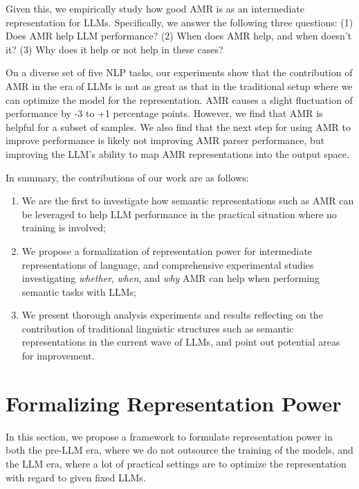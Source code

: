 Given this, we empirically study how good AMR is as an intermediate representation for LLMs.
Specifically, we answer the following three questions:
(1) Does AMR help LLM performance?
(2) When does AMR help, and when doesn't it?
(3) Why does it help or not help in these cases?

On a diverse set of {five} NLP tasks, our experiments show that the contribution of AMR in the era of LLMs is not as great as that in the traditional setup where we can optimize the model for the representation. AMR causes a slight fluctuation of performance by -3 to +1 percentage points. However, we find that AMR is helpful for a subset of samples.
We also find that the next step for using AMR to improve performance is likely not improving AMR parser performance, but
improving the LLM's ability to map AMR representations into the output space.

In summary, the contributions of our work are as follows:
\begin{enumerate}
    \item 
    We are the first to investigate how semantic representations such as AMR can be leveraged to help LLM performance in the practical situation where no training is involved;
    \item 
    We propose a formalization of representation power for intermediate representations of language, and comprehensive experimental studies investigating \textit{whether}, \textit{when}, and \textit{why} AMR can help when performing semantic tasks with LLMs;
    \item We present thorough analysis experiments and results reflecting on the contribution of traditional linguistic structures such as semantic representations in the current wave of LLMs, and point out potential areas for improvement.
\end{enumerate}










\section{Formalizing Representation Power}
\label{sec:repr_power}

In this section, we propose a framework to formulate representation power in both the pre-LLM era, where we do not outsource the training of the models, and the LLM era, where a lot of practical settings are to optimize the representation with regard to given fixed LLMs.
